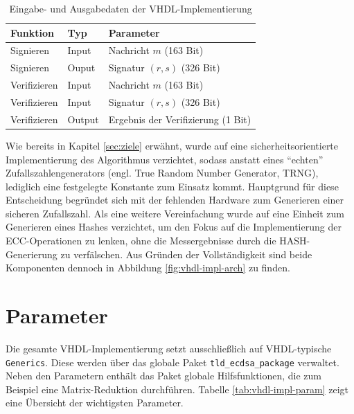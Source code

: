 \begin{table} [h]
	\centering 
	\begin{tabular}{ | p{3cm} | p{2cm} | p{6cm} | }
		\hline
		\textbf{Funktion} & \textbf{Typ} & \textbf{Parameter} \\
		\hline
		Signieren & Input &  Nachricht $m$ (163 Bit) \\
		\hline
		Signieren & Ouput & Signatur $(r,s)$ (326 Bit) \\
		\hline
		Verifizieren & Input & Nachricht $m$ (163 Bit) \\
		\hline
		Verifizieren & Input & Signatur $(r,s)$ (326 Bit) \\
		\hline
		Verifizieren & Output & Ergebnis der Verifizierung (1 Bit) \\
		\hline
	\end{tabular}
	\caption{Eingabe- und Ausgabedaten der VHDL-Implementierung}
	\label{tab:vhdl-impl-uart-data}
\end{table}
 
Wie bereits in Kapitel \ref{sec:ziele} erwähnt, wurde auf eine sicherheitsorientierte Implementierung des Algorithmus verzichtet, sodass anstatt eines ``echten'' Zufallszahlengenerators  (engl. True Random Number Generator, TRNG), lediglich eine festgelegte Konstante zum Einsatz kommt. Hauptgrund für diese Entscheidung begründet sich mit der fehlenden Hardware zum Generieren einer sicheren Zufallszahl. Als eine weitere Vereinfachung wurde auf eine Einheit zum Generieren eines Hashes verzichtet, um den Fokus auf die Implementierung der ECC-Operationen zu lenken, ohne die Messergebnisse durch die HASH-Generierung zu verfälschen. Aus Gründen der Vollständigkeit sind beide Komponenten dennoch in Abbildung \ref{fig:vhdl-impl-arch} zu finden. 


\section{Parameter}
\label{vhdl-impl-parameter}

Die gesamte VHDL-Implementierung setzt ausschließlich auf VHDL-typische \texttt{Generics}. Diese werden über das globale Paket \texttt{tld\_ecdsa\_package} verwaltet. Neben den Parametern enthält das Paket globale Hilfsfunktionen, die zum Beispiel eine Matrix-Reduktion durchführen. Tabelle \ref{tab:vhdl-impl-param} zeigt eine Übersicht der wichtigsten Parameter.

